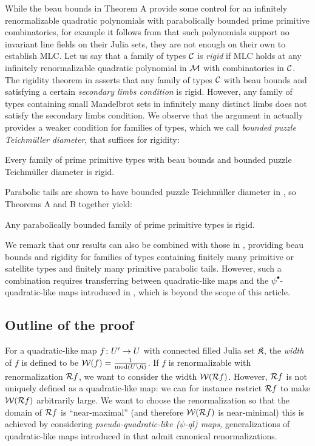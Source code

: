 \documentclass[12pt]{amsart}
\begin{document}
While the beau bounds in Theorem A provide some control for an infinitely renormalizable quadratic polynomials with parabolically bounded prime primitive combinatorics, for example it follows from \cite{McMullen94} that  such polynomials support no invariant line fields on their Julia sets, they are not enough on their own to establish MLC. Let us say that a family of types $\mathcal C$ is \textit{rigid} if MLC holds at any infinitely renormalizable quadratic polynomial in $\mathcal M$ with combinatorics in $\mathcal C$. The rigidity theorem in \cite{lyubich1997dynamics} asserts that any family of types $\mathcal C$ with beau bounds and satisfying a certain \textit{secondary limbs condition} is rigid. 
However, any family of types containing small Mandelbrot sets in infinitely many distinct limbs does not satisfy the secondary limbs condition.
We observe that the argument in \cite{lyubich1997dynamics} actually provides a weaker condition for families of types, which we call \textit{bounded {puzzle} Teichm\"uller diameter}, that suffices for rigidity:
\begin{thmB}
	Every family of prime primitive types with beau bounds and bounded {puzzle} Teichm\"uller diameter is rigid.
\end{thmB}

Parabolic tails are shown to have bounded puzzle Teichm\"uller diameter in \cite{DKLP:elephants}, 
so Theorems A and B together yield:
\begin{thmC}
	Any parabolically bounded family of prime primitive types is rigid.
\end{thmC}


We remark that our results can also be combined with those in \cite{dudko2023mlcfeigenbaumpoints}, providing beau bounds and rigidity for families of types containing finitely many primitive or satellite types and finitely many primitive parabolic tails. 
However, such a combination requires transferring between quadratic-like maps and the $\psi^\bullet$-quadratic-like maps introduced in \cite{dudko2023mlcfeigenbaumpoints}, which is beyond the scope of this article. 


\subsection{Outline of the proof}

For a quadratic-like map $f\colon U'\to U$ with connected filled Julia set $\mathfrak{K}$, the \textit{width} of $f$ is defined to be $\mathcal W(f) = \frac{1}{\operatorname{mod}(U\setminus \mathfrak{K})}$.
If $f$ is renormalizable with renormalization $\mathcal R f$,
{we  want to consider } the width $\mathcal W(\mathcal R f)$.
However, $\mathcal R f$ is not uniquely defined as a quadratic-like map: 
we can for instance restrict $\mathcal R f$ to make $\mathcal W(\mathcal R f)$ arbitrarily large. 
We want to choose the renormalization so that
the domain of $\mathcal R f$ is ``near-maximal''
(and therefore $\mathcal W(\mathcal R f)$ is {near-minimal})
this is achieved by considering {\em pseudo-quadratic-like ($\psi$-ql) maps,} 
generalizations of quadratic-like maps introduced in \cite{K06} 
{that admit} canonical renormalizations. 
\end{document}
